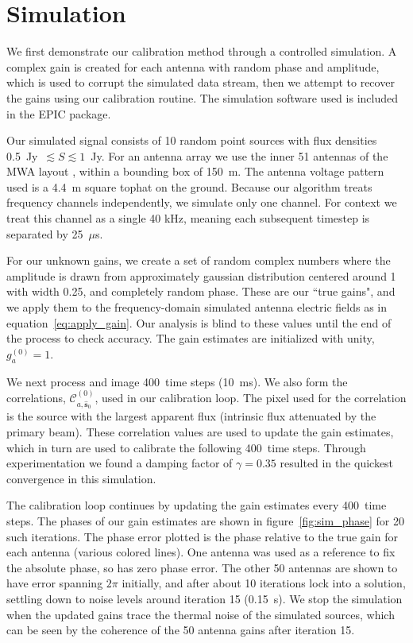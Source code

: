 \documentclass[a4paper,fleqn,usenatbib]{../mnras}
\newcommand{\spix}{\ensuremath{\hat{\mathbf{s}}_{0}}}
\newcommand{\Cna}[1][n]{\ensuremath{\mathcal{C}^{(#1)}_{a,\spix}}}
\newcommand{\caliter}{400}
\newcommand{\damp}{\ensuremath{\gamma}}
\begin{document}

\section{Simulation}\label{sec:sim}
We first demonstrate our calibration method through a controlled simulation. A complex gain is created for each antenna with random phase and amplitude, which is used to corrupt the simulated data stream, then we attempt to recover the gains using our calibration routine. The simulation software used is included in the EPIC package.

Our simulated signal consists of 10 random point sources with flux densities 0.5~Jy~$\lesssim S \lesssim 1$~Jy. For an antenna array we use the inner 51 antennas of the MWA layout \citep{bea12}, within a bounding box of 150~m. The antenna voltage pattern used is a 4.4~m square tophat on the ground. Because our algorithm treats frequency channels independently, we simulate only one channel. For context we treat this channel as a single 40 kHz, meaning each subsequent timestep is separated by 25~$\mu$s.

For our unknown gains, we create a set of random complex numbers where the amplitude is drawn from approximately gaussian distribution centered around 1 with width 0.25, and completely random phase. These are our ``true gains", and we apply them to the frequency-domain simulated antenna electric fields as in equation~\ref{eq:apply_gain}. Our analysis is blind to these values until the end of the process to check accuracy. The gain estimates are initialized with unity, $g^{(0)}_a=1$.

We next process and image \caliter~time steps (10~ms). We also form the correlations, \Cna[0], used in our calibration loop. The pixel used for the correlation is the source with the largest apparent flux (intrinsic flux attenuated by the primary beam). These correlation values are used to update the gain estimates, which in turn are used to calibrate the following \caliter~time steps. Through experimentation we found a damping factor of $\damp=0.35$ resulted in the quickest convergence in this simulation.

The calibration loop continues by updating the gain estimates every \caliter~time steps. The phases of our gain estimates are shown in figure~\ref{fig:sim_phase} for 20 such iterations. The phase error plotted is the phase relative to the true gain for each antenna (various colored lines). One antenna was used as a reference to fix the absolute phase, so has zero phase error. The other 50 antennas are shown to have error spanning $2\pi$ initially, and after about 10 iterations lock into a solution, settling down to noise levels around iteration 15 (0.15~s). We stop the simulation when the updated gains trace the thermal noise of the simulated sources, which can be seen by the coherence of the 50 antenna gains after iteration 15.
\end{document}
